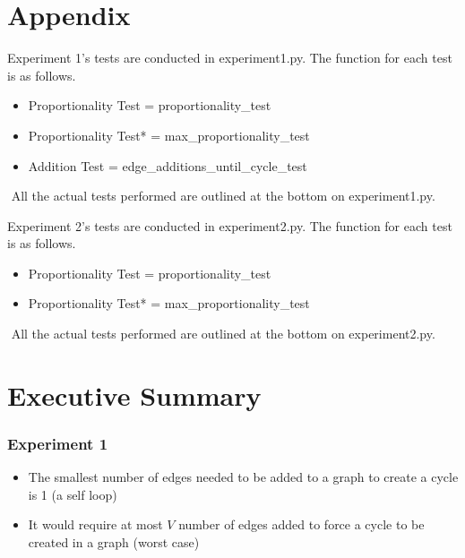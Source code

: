 \documentclass[12pt]{article}
\begin{document}
%
%
%
%
\newpage
\section{Appendix}

Experiment 1's tests are conducted in experiment1.py.
The function for each test is as follows.
\begin{itemize}
    \item Proportionality Test = proportionality\_test\(\)
    \item Proportionality Test* = max\_proportionality\_test\(\)
    \item Addition Test = edge\_additions\_until\_cycle\_test\(\)
\end{itemize}
$ $
\newline
All the actual tests performed are outlined at the bottom on experiment1.py.
\newline
$ $
\newline

Experiment 2's tests are conducted in experiment2.py.
The function for each test is as follows.
\begin{itemize}
    \item Proportionality Test = proportionality\_test\(\)
    \item Proportionality Test* = max\_proportionality\_test\(\)
\end{itemize}
$ $
\newline
All the actual tests performed are outlined at the bottom on experiment2.py.



\newpage
\section{Executive Summary}

\subsubsection{Experiment 1}
\begin{itemize}
    \item The smallest number of edges needed to be added to a graph to create a cycle is 1 (a self loop)
    \item It would require at most $V$ number of edges added to force a cycle to be created in a graph (worst case) 
  \end{itemize}
\end{document}
